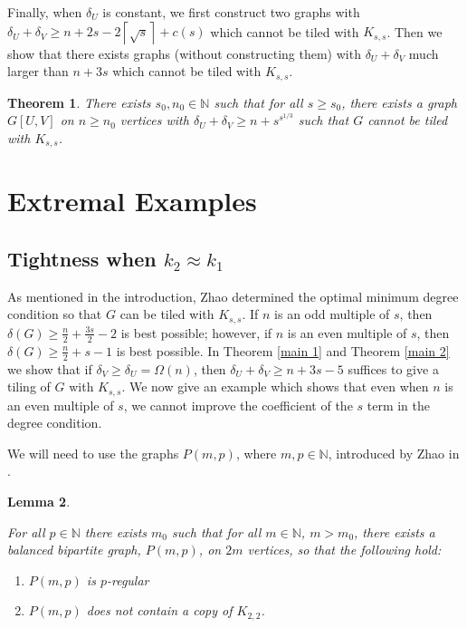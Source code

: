 \documentclass[oneside,12pt]{memoir}
\newtheorem{theorem}{Theorem}[section]
\newtheorem{lemma}[theorem]{Lemma}
\newcommand{\croot}[1]{\left\lceil\sqrt{#1}\right\rceil}
\begin{document}
Finally, when $\delta_U$ is constant, we first construct two graphs with $\delta_U+\delta_V\geq n+2s-2\croot{s}+c(s)$ which cannot be tiled with $K_{s,s}$.  Then we show that there exists graphs (without constructing them) with $\delta_U+\delta_V$ much larger than $n+3s$ which cannot be tiled with $K_{s,s}$.

\begin{theorem}\label{probexample}
There exists $s_0, n_0\in \mathbb{N}$ such that for all $s\geq s_0$, there exists a graph $G[U, V]$ on $n\geq n_0$ vertices with $\delta_U+\delta_V\geq n+s^{s^{1/3}}$ such that $G$ cannot be tiled with $K_{s,s}$.
\end{theorem}


\section{Extremal Examples}


\subsection{Tightness when $k_2\approx k_1$}

As mentioned in the introduction, Zhao determined the optimal minimum degree condition so that $G$ can be tiled with $K_{s,s}$.  If $n$ is an odd multiple of $s$, then $\delta(G)\geq \frac{n}{2}+\frac{3s}{2}-2$ is best possible; however, if $n$ is an even multiple of $s$, then $\delta(G)\geq \frac{n}{2}+s-1$ is best possible.  In Theorem \ref{main 1} and Theorem \ref{main 2} we show that if $\delta_V\geq \delta_U=\Omega(n)$, then $\delta_U+\delta_V\geq n+3s-5$ suffices to give a tiling of $G$ with $K_{s,s}$.  We now give an example which shows that even when $n$ is an even multiple of $s$, we cannot improve the coefficient of the $s$ term in the degree condition.

We will need to use the graphs $P(m,p)$, where $m,p\in\mathbb{N}$, introduced by Zhao in \cite{Z}.

\begin{lemma}\label{Zhao:No K22}

For all $p\in\mathbb{N}$ there exists $m_0$ such that for all $m\in \mathbb{N}$, $m>m_0$, there exists a balanced bipartite graph, $P(m,p)$, on $2m$ vertices, so that the following hold:
\begin{enumerate}
\item $P(m,p)$ is $p$-regular

\item $P(m,p)$ does not contain a copy of $K_{2,2}$.
\end{enumerate}

\end{lemma}
\end{document}
